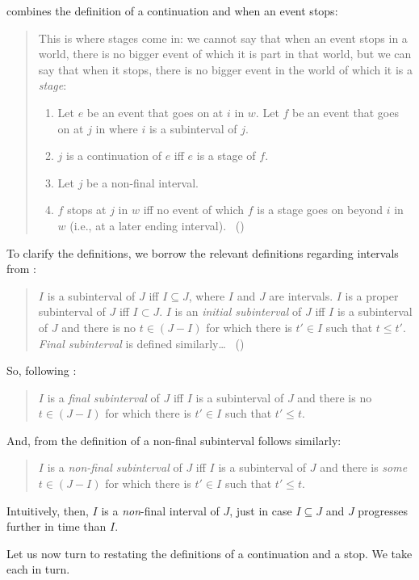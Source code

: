 \begin{note}
  \citeauthor{Landman:1992wh} combines the definition of a continuation and when an event stops:
  \begin{quote}
    This is where stages come in: we cannot say that when an event stops in a world, there is no bigger event of which it is part in that world, but we can say that when it stops, there is no bigger event in the world of which it is a \emph{stage}:
    \begin{enumerate}[label=, noitemsep]
    \item
      Let \(e\) be an event that goes on at \(i\) in \(w\).
      Let \(f\) be an event that goes on at \(j\) in where \(i\) is a subinterval of \(j\).
    \item
      \(j\) is a continuation of \(e\) iff \(e\) is a stage of \(f\).
    \item
      Let \(j\) be a non-final interval.
    \item
      \(f\) stops at \(j\) in \(w\) iff no event of which \(f\) is a stage goes on beyond \(i\) in \(w\) (i.e., at a later ending interval).\newline
      \mbox{ }\hfill\mbox{(\citeyear[23--24]{Landman:1992wh})}
    \end{enumerate}
  \end{quote}

  To clarify the definitions, we borrow the relevant definitions regarding intervals from \textcite{Dowty:1979vq}:

  \begin{quote}
    \(I\) is a subinterval of \(J\) iff \(I \subseteq J\), where \(I\) and \(J\) are intervals.
    \(I\) is a proper subinterval of \(J\) iff \(I \subset J\).
    \(I\) is an \emph{initial subinterval} of \(J\) iff \(I\) is a subinterval of \(J\) and there is no \(t \in (J - I)\) for which there is \(t' \in I\) such that \(t \leq t'\).
    \emph{Final subinterval} is defined similarly\dots\newline
    \mbox{ }\hfill\mbox{(\citeyear[140]{Dowty:1979vq})}
  \end{quote}
  So, following \citeauthor{Dowty:1979vq}:
  \begin{quote}
    \(I\) is a \emph{final subinterval} of \(J\) iff \(I\) is a subinterval of \(J\) and there is no \(t \in (J - I)\) for which there is \(t' \in I\) such that \(t' \leq t\).
  \end{quote}
  And, from the definition of a non-final subinterval follows similarly:
  \begin{quote}
    \(I\) is a \emph{non-final subinterval} of \(J\) iff \(I\) is a subinterval of \(J\) and there is \emph{some} \(t \in (J - I)\) for which there is \(t' \in I\) such that \(t' \leq t\).
  \end{quote}
  Intuitively, then, \(I\) is a \emph{non}-final interval of \(J\), just in case \(I \subseteq J\) and \(J\) progresses further in time than \(I\).

  Let us now turn to restating the definitions of a continuation and a stop.
  We take each in turn.
\end{note}

